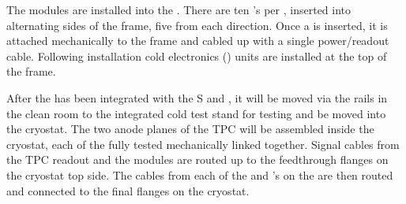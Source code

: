 


The  modules are installed into the . There are ten 's per , inserted into alternating sides of the  frame, five from each direction. Once a  is inserted, it is attached mechanically to the  frame  and cabled up with a single power/readout cable. Following  installation cold electronics () units are installed at the top of the  frame.

After the  has been integrated with the S and , it will be moved via the rails in the clean room to the integrated cold test stand for testing and be moved into the cryostat. The two anode planes of the TPC will be assembled inside the cryostat, each of the fully tested  mechanically linked together. Signal cables from the TPC readout and the  modules are routed up to the feedthrough flanges on the cryostat top side. The cables from each of the  and 's on the  are then routed and connected to the final flanges on the cryostat.

